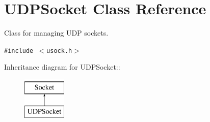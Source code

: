 \hypertarget{classUDPSocket}{
\section{UDPSocket Class Reference}
\label{classUDPSocket}
}
Class for managing UDP sockets.  


{\tt \#include $<$usock.h$>$}

Inheritance diagram for UDPSocket::\begin{figure}[H]
\begin{center}
\leavevmode
\includegraphics[height=2cm]{classUDPSocket}
\end{center}
\end{figure}
